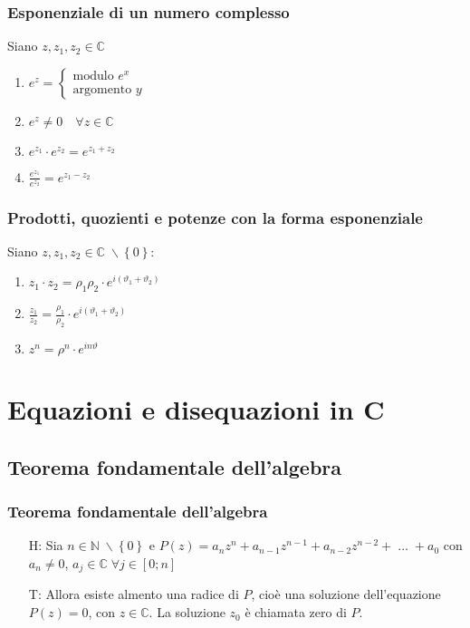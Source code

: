 \documentclass[a4paper]{article}
\begin{document}
\subsubsection*{Esponenziale di un numero complesso}
Siano \(z, z_1, z_2 \in \mathbb{C}\)
\begin{enumerate}
	\item \(e^z =
	\begin{cases}
		\text{modulo } e^x \\
		\text{argomento } y
	\end{cases}\)
	\item \(e ^ z \neq 0 \quad \forall z \in \mathbb{C}\)
	\item \(e ^ {z_1} \cdot e ^ {z_2} = e ^ {z_1 + z_2}\)
	\item \(\displaystyle \frac{e ^ {z_1}}{e ^ {z_2}} = e ^ {z_1 - z_2}\)
\end{enumerate}

\subsubsection*{Prodotti, quozienti e potenze con la forma esponenziale}
Siano \(z, z_1, z_2 \in \mathbb{C} \; \backslash \left\{ 0 \right\}\):
\begin{enumerate}
	\item \(z_1 \cdot z_2 = \rho_1 \rho_2 \cdot e ^ {i \left( \vartheta_1 + \vartheta_2 \right)}\)
	\item \(\displaystyle \frac{z_1}{z_2} = \frac{\rho_1}{\rho_2} \cdot e ^ {i \left( \vartheta_1 + \vartheta_2 \right)}\)
	\item \(z ^ n = \rho ^ n \cdot e ^ {i n \vartheta}\)
\end{enumerate}

\newpage


\section{Equazioni e disequazioni in C}
\subsection{Teorema fondamentale dell'algebra}
\subsubsection*{Teorema fondamentale dell'algebra}
\begin{itemize}
	\item[H:] Sia \(n \in \mathbb{N} \; \backslash \left\{ 0 \right\}\) e \(P(z) = a_n z^n + a_{n-1} z^{n-1} + a_{n-2} z^{n-2} + \; \dots \; + a_0\)
	con \(a_n \neq 0\), \(a_j \in \mathbb{C} \; \forall j \in \left[0; n\right]\) 
	\item[T:] Allora esiste almento una radice di \(P\), cioè una soluzione dell'equazione \(P(z) = 0\), con \(z \in \mathbb{C}\).
	La soluzione \(z_0\) è chiamata zero di \(P\).
\end{itemize}
\end{document}
